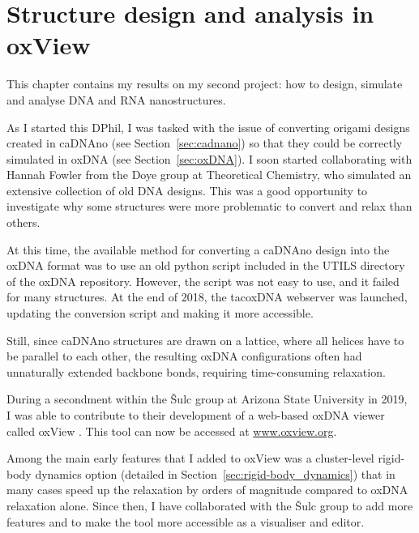 \chapter{\label{ch:oxview}Structure design and analysis in oxView}

\minitoc

This chapter contains my results on my second project: how to design, simulate and analyse DNA and RNA nanostructures. 


As I started this DPhil, I was tasked with the issue of converting origami designs created in caDNAno (see Section~\ref{sec:cadnano}) so that they could be correctly simulated in oxDNA (see Section~\ref{sec:oxDNA}). I soon started collaborating with Hannah Fowler from the Doye group at Theoretical Chemistry, who simulated an extensive collection of old DNA designs. This was a good opportunity to investigate why some structures were more problematic to convert and relax than others.

At this time, the available method for converting a caDNAno design into the oxDNA format was to use an old python script included in the UTILS directory of the oxDNA repository. However, the script was not easy to use, and it failed for many structures. At the end of 2018, the tacoxDNA webserver \cite{suma2019tacoxdna} was launched, updating the conversion script and making it more accessible.

Still, since caDNAno structures are drawn on a lattice, where all helices have to be parallel to each other, the resulting oxDNA configurations often had unnaturally extended backbone bonds, requiring time-consuming relaxation.

During a secondment within the {\v{S}}ulc group at Arizona State University in 2019, I was able to contribute to their development of a web-based oxDNA viewer called oxView \cite{poppleton2020design, bohlin2021design}. This tool can now be accessed at {\large\url{www.oxview.org}}.

Among the main early features that I added to oxView was a cluster-level rigid-body dynamics option (detailed in Section~\ref{sec:rigid-body_dynamics}) that in many cases speed up the relaxation by orders of magnitude compared to oxDNA relaxation alone. Since then, I have collaborated with the {\v{S}}ulc group to add more features and to make the tool more accessible as a visualiser and editor. 

